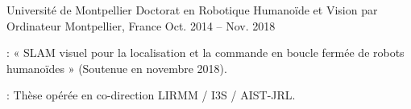 

\begin{cventries}

\cventry
    {Université de Montpellier} %
    {Doctorat en Robotique Humanoïde et Vision par Ordinateur} %
    {Montpellier, France} %
    {Oct. 2014 -- Nov. 2018} %
    {
      \begin{cvitems} 
        \item {} : « SLAM visuel pour la localisation et la commande en boucle fermée de robots humanoïdes » (Soutenue en novembre 2018).
        \item {} : Thèse opérée en co-direction LIRMM / I3S / AIST-JRL.
      \end{cvitems}
    }


\end{cventries}

